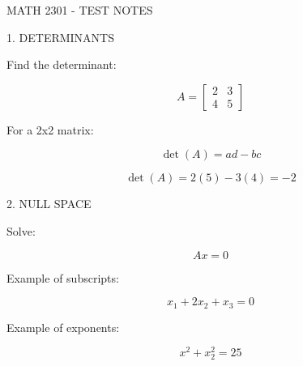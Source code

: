 
MATH 2301 - TEST NOTES

1. DETERMINANTS

Find the determinant:

$$
A=\begin{bmatrix}
2 & 3\\
4 & 5
\end{bmatrix}
$$

For a 2x2 matrix:

$$
\det(A)=ad-bc
$$

$$
\det(A)=2(5)-3(4)=-2
$$

2. NULL SPACE

Solve:

$$
Ax=0
$$

Example of subscripts:

$$
x_1+2x_2+x_3=0
$$

Example of exponents:

$$
x^2+x_2^2=25
$$
